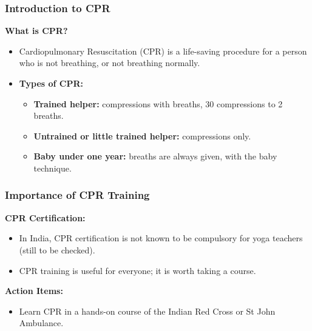 \begin{frame}[fragile]\frametitle{Introduction to CPR}
    \textbf{What is CPR?}
    \begin{itemize}
        \item Cardiopulmonary Resuscitation (CPR) is a life-saving procedure for a person who is not breathing, or not breathing normally.
        \item \textbf{Types of CPR:}
        \begin{itemize}
            \item \textbf{Trained helper:} compressions with breaths, 30 compressions to 2 breaths.
            \item \textbf{Untrained or little trained helper:} compressions only.
            \item \textbf{Baby under one year:} breaths are always given, with the baby technique.
        \end{itemize}
    \end{itemize}
\end{frame}

\begin{frame}[fragile]\frametitle{Importance of CPR Training}
    \textbf{CPR Certification:}
    \begin{itemize}
        \item In India, CPR certification is not known to be compulsory for yoga teachers (still to be checked).
        \item CPR training is useful for everyone; it is worth taking a course.
    \end{itemize}

    \textbf{Action Items:}
    \begin{itemize}
        \item Learn CPR in a hands-on course of the Indian Red Cross or St John Ambulance.
    \end{itemize}
\end{frame}



